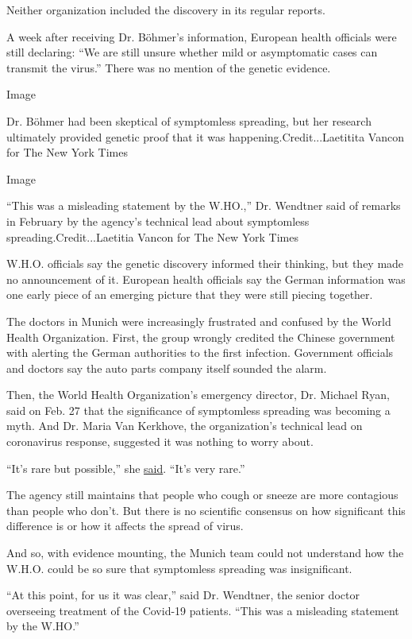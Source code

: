 Neither organization included the discovery in its regular reports.

A week after receiving Dr. Böhmer's information, European health
officials were still declaring: ``We are still unsure whether mild or
asymptomatic cases can transmit the virus.'' There was no mention of the
genetic evidence.

Image

Dr. Böhmer had been skeptical of symptomless spreading, but her research
ultimately provided genetic proof that it was
happening.Credit...Laetitita Vancon for The New York Times

Image

``This was a misleading statement by the W.HO.,'' Dr. Wendtner said of
remarks in February by the agency's technical lead about symptomless
spreading.Credit...Laetitia Vancon for The New York Times

W.H.O. officials say the genetic discovery informed their thinking, but
they made no announcement of it. European health officials say the
German information was one early piece of an emerging picture that they
were still piecing together.

The doctors in Munich were increasingly frustrated and confused by the
World Health Organization. First, the group wrongly credited the Chinese
government with alerting the German authorities to the first infection.
Government officials and doctors say the auto parts company itself
sounded the alarm.

Then, the World Health Organization's emergency director, Dr. Michael
Ryan, said on Feb. 27 that the significance of symptomless spreading was
becoming a myth. And Dr. Maria Van Kerkhove, the organization's
technical lead on coronavirus response, suggested it was nothing to
worry about.

``It's rare but possible,'' she
\href{https://www.youtube.com/watch?v=SCgCzYAHusA\&t=22m55s}{said}.
``It's very rare.''

The agency still maintains that people who cough or sneeze are more
contagious than people who don't. But there is no scientific consensus
on how significant this difference is or how it affects the spread of
virus.

And so, with evidence mounting, the Munich team could not understand how
the W.H.O. could be so sure that symptomless spreading was
insignificant.

``At this point, for us it was clear,'' said Dr. Wendtner, the senior
doctor overseeing treatment of the Covid-19 patients. ``This was a
misleading statement by the W.HO.''

